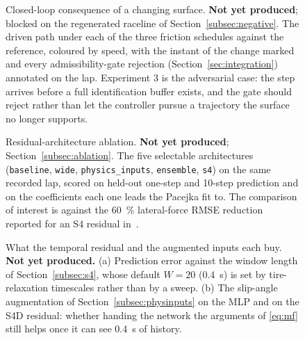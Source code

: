 \begin{figure}[t]
\centering
{}
\caption{Closed-loop consequence of a changing surface. \textbf{Not yet
produced}; blocked on the regenerated raceline of
Section~\ref{subsec:negative}. The driven path under each of the three
friction schedules against the reference, coloured by speed, with the instant
of the change marked and every admissibility-gate rejection
(Section~\ref{sec:integration}) annotated on the lap. Experiment 3 is the
adversarial case: the step arrives before a full identification buffer exists,
and the gate should reject rather than let the controller pursue a trajectory
the surface no longer supports.}
\label{fig:mutrajectories}
\end{figure}


\begin{figure}[t]
\centering
{}
\caption{Residual-architecture ablation. \textbf{Not yet produced};
Section~\ref{subsec:ablation}. The five selectable architectures
(\texttt{baseline}, \texttt{wide}, \texttt{physics\_inputs}, \texttt{ensemble},
\texttt{s4}) on the same recorded lap, scored on held-out one-step and 10-step
prediction and on the coefficients each one leads the Pacejka fit to. The
comparison of interest is against the \SI{60}{\percent} lateral-force RMSE
reduction reported for an S4 residual in~\cite{visionsysid2026}.}
\label{fig:archablation}
\end{figure}

\begin{figure}[t]
\centering
{}
\caption{What the temporal residual and the augmented inputs each buy.
\textbf{Not yet produced.} (a) Prediction error against the window length of
Section~\ref{subsec:s4}, whose default $W=20$ (\SI{0.4}{\second}) is set by
tire-relaxation timescales rather than by a sweep. (b) The slip-angle
augmentation of Section~\ref{subsec:physinputs} on the MLP and on the S4D
residual: whether handing the network the arguments of \eqref{eq:mf} still
helps once it can see \SI{0.4}{\second} of history.}
\label{fig:physinputs}
\end{figure}

